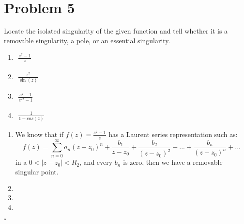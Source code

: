 \documentclass[12pt]{article}
\newenvironment{proof}{\noindent{\bf Proof.}}{\hfill $\square$\medskip}
\begin{document}
\section{Problem 5}
Locate the isolated singularity of the given function and tell whether it is a removable singularity, a pole, or an essential singularity.
\begin{enumerate}[label=\textbf{(\alph*)}]
    \item
          \begin{flushleft}
              $\begin{aligned}
                      \frac{e^{z}-1}{z}
                  \end{aligned}$
          \end{flushleft}
    \item
          \begin{flushleft}
              $\begin{aligned}
                      \frac{z^{2}}{\sin(z)}
                  \end{aligned}$
          \end{flushleft}
    \item
          \begin{flushleft}
              $\begin{aligned}
                      \frac{e^{z}-1}{e^{2z}-1}
                  \end{aligned}$
          \end{flushleft}
    \item
          \begin{flushleft}
              $\begin{aligned}
                      \frac{1}{1-cos(z)}
                  \end{aligned}$
          \end{flushleft}
\end{enumerate}

\begin{proof}
    \begin{enumerate}[label=\textbf{(\alph*)}]
        \item We know that if $f(z)=\frac{e^{z}-1}{z}$ has a Laurent series representation such as:
        $$f(z)=\sum_{n=0}^{\infty}a_{n}(z-z_{0})^{n}+\frac{b_{1}}{z-z_{0}}+\frac{b_{2}}{(z-z_{0})^{2}}+...+\frac{b_{n}}{(z-z_{0})^{n}}+...$$
        in a $0<\left|z-z_{0}\right|<R_{2}$, and every $b_{n}$ is zero, then we have a removable singular point.
        \item
        \item
        \item
    \end{enumerate}
\end{proof}
\end{document}
